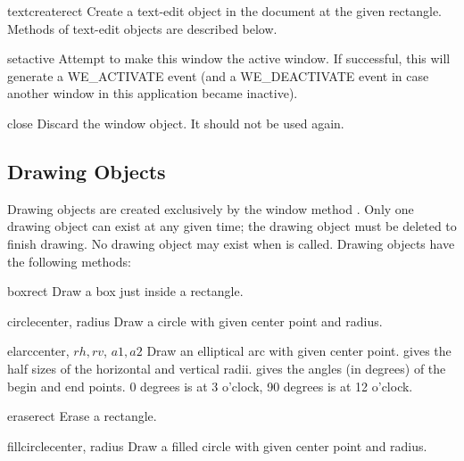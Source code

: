 \begin{funcdesc}{textcreate}{rect}
Create a text-edit object in the document at the given rectangle.
Methods of text-edit objects are described below.
\end{funcdesc}

\begin{funcdesc}{setactive}{}
Attempt to make this window the active window.  If successful, this
will generate a WE_ACTIVATE event (and a WE_DEACTIVATE event in case
another window in this application became inactive).
\end{funcdesc}

\begin{funcdesc}{close}{}
Discard the window object.  It should not be used again.
\end{funcdesc}

\subsection{Drawing Objects}

Drawing objects are created exclusively by the window method
.
Only one drawing object can exist at any given time; the drawing object
must be deleted to finish drawing.
No drawing object may exist when
is called.
Drawing objects have the following methods:


\begin{funcdesc}{box}{rect}
Draw a box just inside a rectangle.
\end{funcdesc}

\begin{funcdesc}{circle}{center, radius}
Draw a circle with given center point and radius.
\end{funcdesc}

\begin{funcdesc}{elarc}{center, \(rh, rv\), \(a1, a2\)}
Draw an elliptical arc with given center point.
gives the half sizes of the horizontal and vertical radii.
gives the angles (in degrees) of the begin and end points.
0 degrees is at 3 o'clock, 90 degrees is at 12 o'clock.
\end{funcdesc}

\begin{funcdesc}{erase}{rect}
Erase a rectangle.
\end{funcdesc}

\begin{funcdesc}{fillcircle}{center, radius}
Draw a filled circle with given center point and radius.
\end{funcdesc}

